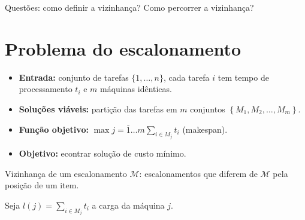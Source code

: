 Questões: como definir a vizinhança? Como percorrer a vizinhança?

\section{Problema do escalonamento}

\begin{itemize}
    \item \textbf{Entrada:} conjunto de tarefas $\{1, \dots , n\}$, cada tarefa $i$ tem tempo de processamento $t_i$ e $m$ máquinas idênticas.
    \item \textbf{Soluções viáveis:} partição das tarefas em $m$ conjuntos $\left\{ M_1, M_2, \dots , M_m\right\}$.
    \item \textbf{Função objetivo:} $\max\bar{j=1\dots m}\sum_{i \in M_j}t_i$ (makespan).
    \item \textbf{Objetivo:} econtrar solução de custo mínimo.
\end{itemize}

Vizinhança de um escalonamento $\mathcal{M}$: escalonamentos que diferem de $\mathcal{M}$ pela posição de um item.

Seja $l(j) = \sum_{i \in M_j} t_i$ a carga da máquina $j$.

\begin{algorithm}
\SetAlgoLined
{}

\end{algorithm}

\newpage

